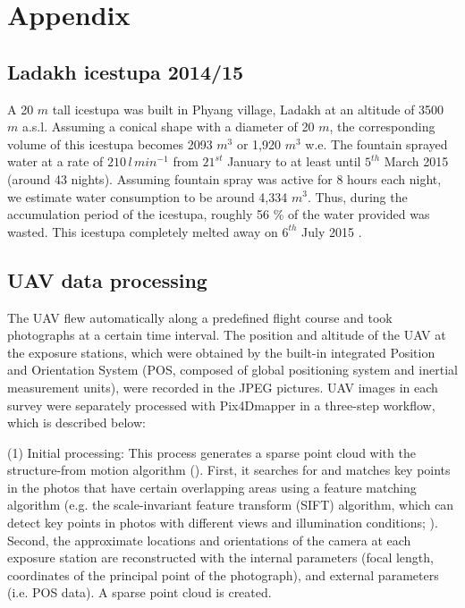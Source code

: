 \documentclass[utf8]{frontiersSCNS}
\begin{document}
\section{Appendix}

\subsection{Ladakh icestupa 2014/15} \label{sec:ladakhloss}

A 20 $m$ tall icestupa \citep{iceheight} was built in Phyang village, Ladakh at an altitude of 3500 $m$ a.s.l.
Assuming a conical shape with a diameter of 20 $m$, the corresponding volume of this icestupa becomes 2093 $m^3$ or
1,920 $m^3$ w.e. The fountain sprayed water at a rate of $210\, l\,min^{-1}$ \citep{waterinput} from $21^{st}$
January \citep{waterstart} to at least until $5^{th}$ March 2015 \citep{waterend} (around 43 nights). Assuming
fountain spray was active for 8 hours each night, we estimate water consumption to be around 4,334 $m^3$. Thus,
during the accumulation period of the icestupa, roughly 56 \% of the water provided was wasted.  This icestupa
completely melted away on $6^{th}$ July 2015 \citep{coneends}.

\subsection{UAV data processing} \label{sec:uav}
The UAV flew automatically along a predefined flight course and took photographs at a certain time interval. The
position and altitude of the UAV at the exposure stations, which were obtained by the built-in integrated
Position and Orientation System (POS, composed of global positioning system and inertial measurement units),
were recorded in the JPEG pictures. UAV images in each survey were separately processed with Pix4Dmapper in a
three-step workflow, which is described below:

(1) Initial processing: This process generates a sparse point cloud with the structure-from motion algorithm
(\cite{Turner_2012}). First, it searches for and matches key points in the photos that have certain overlapping
areas using a feature matching algorithm (e.g. the scale-invariant feature transform (SIFT) algorithm, which can
detect key points in photos with different views and illumination conditions; \cite{Lowe_2004}). Second, the
approximate locations and orientations of the camera at each exposure station are reconstructed with the internal
parameters (focal length, coordinates of the principal point of the photograph), and external parameters (i.e. POS
data). A sparse point cloud is created.
\end{document}
